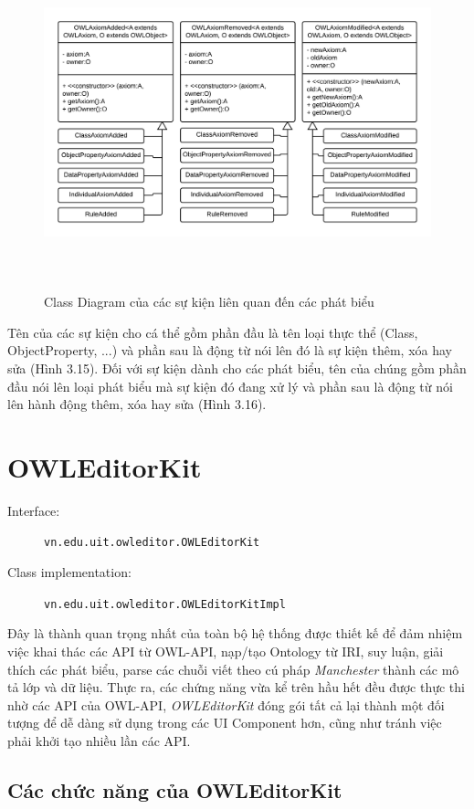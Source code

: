 {\begin{figure}[h!]
	\includegraphics[height=97mm]{Figures/uml_axiom_event.png}
	\caption{Class Diagram của các sự kiện liên quan đến các phát biểu \label{overflow}}
\end{figure}
Tên của các sự kiện cho cá thể gồm phần đầu là tên loại thực thể (Class, ObjectProperty, ...) và phần sau là động từ nói lên đó là sự kiện thêm, xóa hay sửa (Hình 3.15). Đối với sự kiện dành cho các phát biểu, tên của chúng gồm phần đầu nói lên loại phát biểu mà sự kiện đó đang xử lý và phần sau là động từ nói lên hành động thêm, xóa hay sửa (Hình 3.16).
\\
\section{OWLEditorKit}
\begin{description}
	\item[Interface:] \verb|vn.edu.uit.owleditor.OWLEditorKit|
	\item[Class implementation:] \verb|vn.edu.uit.owleditor.OWLEditorKitImpl|
\end{description}
Đây là thành quan trọng nhất của toàn bộ hệ thống được thiết kế để đảm nhiệm việc khai thác các API từ OWL-API, nạp/tạo Ontology từ IRI, suy luận, giải thích các phát biểu, parse các chuỗi viết theo cú pháp \textit{Manchester} thành các mô tả lớp và dữ liệu. Thực ra, các chứng năng vừa kể trên hầu hết đều được thực thi nhờ các API của OWL-API, \textit{OWLEditorKit} đóng gói tất cả lại thành một đối tượng để dễ dàng sử dụng trong các UI Component hơn, cũng như tránh việc phải khởi tạo nhiều lần các API. 
\subsection{Các chức năng của OWLEditorKit}

}
